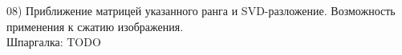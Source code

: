 08) Приближение матрицей указанного ранга и SVD-разложение. Возможность применения к сжатию изображения.\\

Шпаргалка: TODO\\
